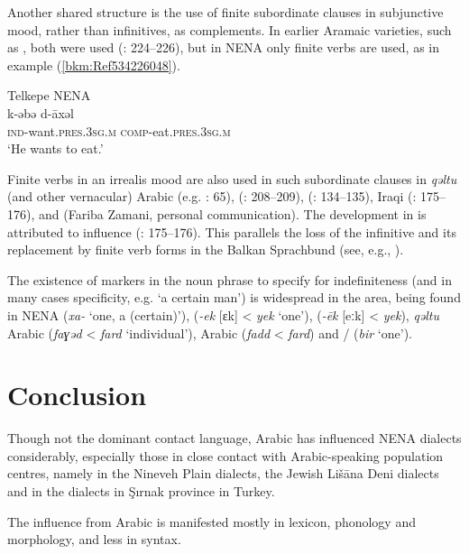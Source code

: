 \documentclass[output=paper]{langsci/langscibook}
\begin{document}
Another shared structure is the use of finite subordinate clauses in subjunctive mood, rather than infinitives, as complements. In earlier Aramaic varieties, such as  , both were used (\citealt{Nöldeke1904Syriac}: 224–226), but in NENA only finite verbs are used, as in example (\ref{bkm:Ref534226048}).

\ea\label{bkm:Ref534226048} Telkepe NENA\\
\gll k-əbə       d-āxəl\\
    \textsc{ind-}\textup{want.}\textsc{pres}.\textsc{3sg.m} \textsc{comp}\textup{{}-eat.}\textsc{pres}.\textsc{3sg.m}\\
\glt ‘He wants to eat.’\z

Finite verbs in an irrealis mood are also used in such subordinate clauses in \textit{qəltu} (and other vernacular) Arabic (e.g. \citealt{Jastrow1990book}: 65),  (\citealt{MacKenzie1961}: 208–209),  (\citealt{MacKenzie1961}: 134–135), Iraqi  (\citealt{Bulut2007}: 175–176), and   (Fariba Zamani, personal communication). The development in  is attributed to  influence (\citealt{Bulut2007}: 175–176). This parallels the loss of the {infinitive} and its replacement by finite verb forms in the Balkan Sprachbund (see, e.g., \citealt{Joseph2009}).

The existence of markers in the {noun phrase} to specify for indefiniteness (and in many cases specificity, e.g. ‘a certain man’) is widespread in the area, being found in NENA (\textit{xa-} ‘one, a (certain)’),  (\textit{\nobreakdash-ek} [ɛk] < \textit{yek} `one'),  (\textit{\nobreakdash-ēk} [eːk] < \textit{yek}), \textit{qəltu} Arabic (\textit{faɣəd} < \textit{fard} `individual'),  Arabic (\textit{fadd} < \textit{fard}) and / (\textit{bir} `one').


\section{Conclusion}

Though not the dominant contact language, Arabic has influenced NENA dialects considerably, especially those in close contact with Arabic-speaking population centres, namely in the  Nineveh Plain dialects, the Jewish Lišāna Deni dialects and in the  dialects in Şırnak province in Turkey.

The influence from Arabic is manifested mostly in lexicon, phonology and morphology, and less in syntax.
\end{document}
